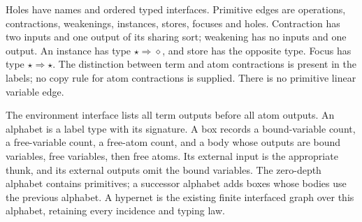 




Holes have names and ordered typed interfaces. Primitive edges are operations,
contractions, weakenings, instances, stores, focuses and holes. Contraction
has two inputs and one output of its sharing sort; weakening has no inputs
and one output. An instance has type $\star\Rightarrow\diamond$, and store has
the opposite type. Focus has type $\star\Rightarrow\star$. The distinction
between term and atom contractions is present in the labels; no copy rule for
atom contractions is supplied. There is no primitive linear variable edge.




The environment interface lists all term outputs before all atom outputs.
An alphabet is a label type with its signature. A box records a bound-variable
count, a free-variable count, a free-atom count, and a body whose outputs are
bound variables, free variables, then free atoms. Its external input is the
appropriate thunk, and its external outputs omit the bound variables.
The zero-depth alphabet contains primitives; a successor alphabet adds boxes
whose bodies use the previous alphabet. A hypernet is the existing finite
interfaced graph over this alphabet, retaining every incidence and typing law.








